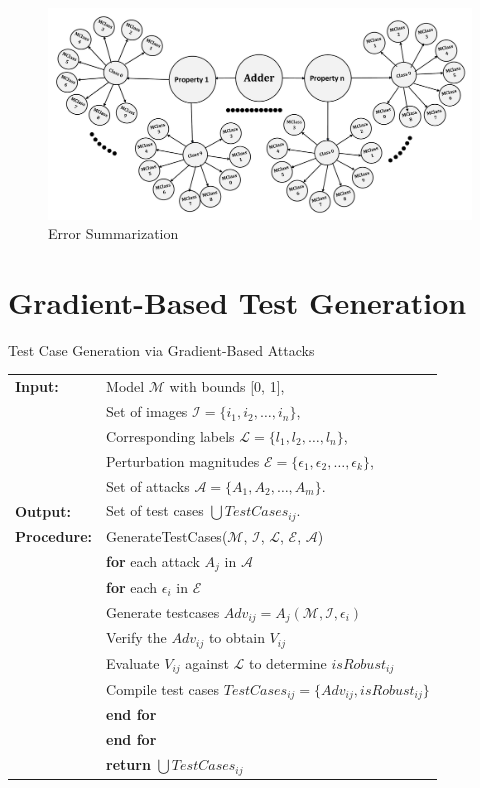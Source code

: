 \begin{figure}[h]
    \centering
    \includegraphics[width=1\textwidth]{figures/step5.pdf}
    \caption{Error Summarization}
    \label{Summarization}
\end{figure}

\section{Gradient-Based Test Generation}

\begin{algorithm}
    \caption{Test Case Generation via Gradient-Based Attacks}
    \begin{tabular}{l l}
    \textbf{Input:} & Model $\mathcal{M}$ with bounds [0, 1], \\
    & Set of images $\mathcal{I} = \{i_1, i_2, \ldots, i_n\}$, \\
    & Corresponding labels $\mathcal{L} = \{l_1, l_2, \ldots, l_n\}$, \\
    & Perturbation magnitudes $\mathcal{E} = \{\epsilon_1, \epsilon_2, \ldots, \epsilon_k\}$, \\
    & Set of attacks $\mathcal{A} = \{A_1, A_2, \ldots, A_m\}$. \\
    \textbf{Output:} & Set of test cases $\bigcup TestCases_{ij}$. \\
    \textbf{Procedure:} & GenerateTestCases($\mathcal{M}$, $\mathcal{I}$, $\mathcal{L}$, $\mathcal{E}$, $\mathcal{A}$) \\
    & \quad \textbf{for} each attack $A_j$ in $\mathcal{A}$ \\
    & \quad \quad \textbf{for} each $\epsilon_i$ in $\mathcal{E}$ \\
    & \quad \quad \quad Generate testcases  $Adv_{ij} = A_j(\mathcal{M}, \mathcal{I}, \epsilon_i)$ \\
    & \quad \quad \quad Verify the $Adv_{ij}$ to obtain $V_{ij}$ \\
    & \quad \quad \quad Evaluate $V_{ij}$ against $\mathcal{L}$ to determine $isRobust_{ij}$ \\
    & \quad \quad \quad Compile test cases $TestCases_{ij} = \{Adv_{ij}, isRobust_{ij}\}$ \\
    & \quad \quad \textbf{end for} \\
    & \quad \textbf{end for} \\
    & \quad \textbf{return} $\bigcup TestCases_{ij}$ \\
    \end{tabular}
\end{algorithm}
